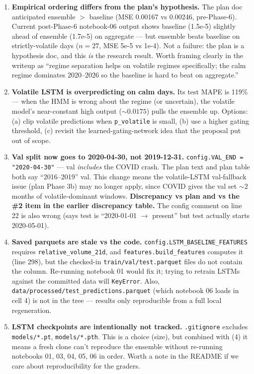 \documentclass[11pt]{article}
\begin{document}
\begin{enumerate}[leftmargin=*]
  \item \textbf{Empirical ordering differs from the plan's hypothesis.} The plan doc anticipated ensemble $>$ baseline (MSE 0.00167 vs 0.00246, pre-Phase-6). Current post-Phase-6 notebook-06 output shows baseline (1.5e-5) slightly ahead of ensemble (1.7e-5) on aggregate --- but ensemble beats baseline on strictly-volatile days ($n=27$, MSE 5e-5 vs 1e-4). Not a failure: the plan is a hypothesis doc, and this \emph{is} the research result. Worth framing clearly in the writeup as ``regime separation helps on volatile regimes specifically; the calm regime dominates 2020--2026 so the baseline is hard to beat on aggregate.''

  \item \textbf{Volatile LSTM is overpredicting on calm days.} Its test MAPE is 119\% --- when the HMM is wrong about the regime (or uncertain), the volatile model's near-constant high output (${\sim}0.0175$) pulls the ensemble up. Options: (a) clip volatile predictions when \texttt{p\_volatile} is small, (b) use a higher gating threshold, (c) revisit the learned-gating-network idea that the proposal put out of scope.

  \item \textbf{Val split now goes to 2020-04-30, not 2019-12-31.} \texttt{config.VAL\_END = "2020-04-30"} --- val \emph{includes} the COVID crash. The plan text and plan table both say ``2016--2019'' val. This change means the volatile-LSTM val-fallback issue (plan Phase 3b) may no longer apply, since COVID gives the val set ${\sim}2$ months of volatile-dominant windows. \textbf{Discrepancy vs plan and vs the \#2 item in the earlier discrepancy table.} The config comment on line 22 is also wrong (says test is ``2020-01-01 $\to$ present'' but test actually starts 2020-05-01).

  \item \textbf{Saved parquets are stale vs the code.} \texttt{config.LSTM\_BASELINE\_FEATURES} requires \texttt{relative\_volume\_21d}, and \texttt{features.build\_features} computes it (line 298), but the checked-in \texttt{train/val/test.parquet} files do not contain the column. Re-running notebook 01 would fix it; trying to retrain LSTMs against the committed data will \texttt{KeyError}. Also, \texttt{data/processed/test\_predictions.parquet} (which notebook 06 loads in cell 4) is not in the tree --- results only reproducible from a full local regeneration.

  \item \textbf{LSTM checkpoints are intentionally not tracked.} \texttt{.gitignore} excludes \texttt{models/*.pt}, \texttt{models/*.pth}. This is a choice (size), but combined with (4) it means a fresh clone can't reproduce the ensemble without re-running notebooks 01, 03, 04, 05, 06 in order. Worth a note in the README if we care about reproducibility for the graders.


\end{enumerate}
\end{document}

